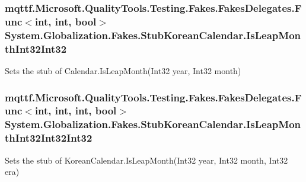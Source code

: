 \hypertarget{class_system_1_1_globalization_1_1_fakes_1_1_stub_korean_calendar_a188034cc9c39f0e6309b4f73d0cfed2b}{
\subsubsection[{Is\-Leap\-Month\-Int32\-Int32}]{\setlength{\rightskip}{0pt plus 5cm}mqttf.\-Microsoft.\-Quality\-Tools.\-Testing.\-Fakes.\-Fakes\-Delegates.\-Func$<$int, int, bool$>$ System.\-Globalization.\-Fakes.\-Stub\-Korean\-Calendar.\-Is\-Leap\-Month\-Int32\-Int32}}\label{class_system_1_1_globalization_1_1_fakes_1_1_stub_korean_calendar_a188034cc9c39f0e6309b4f73d0cfed2b}


Sets the stub of Calendar.\-Is\-Leap\-Month(\-Int32 year, Int32 month)

\hypertarget{class_system_1_1_globalization_1_1_fakes_1_1_stub_korean_calendar_af18cdcfbf2afb08ced8db8bbc8d132de}{
\subsubsection[{Is\-Leap\-Month\-Int32\-Int32\-Int32}]{\setlength{\rightskip}{0pt plus 5cm}mqttf.\-Microsoft.\-Quality\-Tools.\-Testing.\-Fakes.\-Fakes\-Delegates.\-Func$<$int, int, int, bool$>$ System.\-Globalization.\-Fakes.\-Stub\-Korean\-Calendar.\-Is\-Leap\-Month\-Int32\-Int32\-Int32}}\label{class_system_1_1_globalization_1_1_fakes_1_1_stub_korean_calendar_af18cdcfbf2afb08ced8db8bbc8d132de}


Sets the stub of Korean\-Calendar.\-Is\-Leap\-Month(\-Int32 year, Int32 month, Int32 era)

